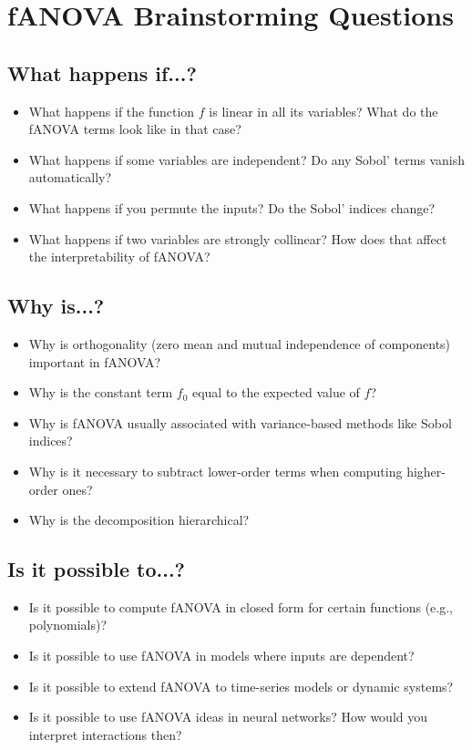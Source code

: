 \section*{fANOVA Brainstorming Questions}

\subsection*{What happens if...?}
\begin{itemize}
    \item What happens if the function \( f \) is linear in all its variables? What do the fANOVA terms look like in that case?
    \item What happens if some variables are independent? Do any Sobol’ terms vanish automatically?
    \item What happens if you permute the inputs? Do the Sobol’ indices change?
    \item What happens if two variables are strongly collinear? How does that affect the interpretability of fANOVA?
\end{itemize}

\subsection*{Why is...?}
\begin{itemize}
    \item Why is orthogonality (zero mean and mutual independence of components) important in fANOVA?
    \item Why is the constant term \( f_0 \) equal to the expected value of \( f \)?
    \item Why is fANOVA usually associated with variance-based methods like Sobol indices?
    \item Why is it necessary to subtract lower-order terms when computing higher-order ones?
    \item Why is the decomposition hierarchical?
\end{itemize}

\subsection*{Is it possible to...?}
\begin{itemize}
    \item Is it possible to compute fANOVA in closed form for certain functions (e.g., polynomials)?
    \item Is it possible to use fANOVA in models where inputs are dependent?
    \item Is it possible to extend fANOVA to time-series models or dynamic systems?
    \item Is it possible to use fANOVA ideas in neural networks? How would you interpret interactions then?
\end{itemize}

